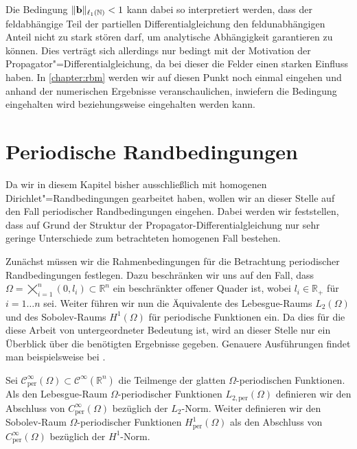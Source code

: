 \documentclass[../main.tex]{subfiles}
\begin{document}
Die Bedingung $\lVert\mathbf{b}\rVert_{\ell_{1}(\mathbb{N})} < 1$ kann dabei so interpretiert werden, dass der feldabhängige Teil der partiellen Differentialgleichung den feldunabhängigen Anteil nicht zu stark stören darf, um analytische Abhängigkeit garantieren zu können.
Dies verträgt sich allerdings nur bedingt mit der Motivation der Propagator"=Differentialgleichung, da bei dieser die Felder einen starken Einfluss haben.
In \cref{chapter:rbm} werden wir auf diesen Punkt noch einmal eingehen und anhand der numerischen Ergebnisse veranschaulichen, inwiefern die Bedingung eingehalten wird beziehungsweise eingehalten werden kann.

\section{Periodische Randbedingungen} %
\label{section:periodische_randbedingungen}

Da wir in diesem Kapitel bisher ausschließlich mit homogenen Dirichlet"=Randbedingungen gearbeitet haben, wollen wir an dieser Stelle auf den Fall periodischer Randbedingungen eingehen.
Dabei werden wir feststellen, dass auf Grund der Struktur der Propagator-Differentialgleichung nur sehr geringe Unterschiede zum betrachteten homogenen Fall bestehen.

Zunächst müssen wir die Rahmenbedingungen für die Betrachtung periodischer Randbedingungen festlegen.
Dazu beschränken wir uns auf den Fall, dass $\Omega = \bigtimes_{i = 1}^{n} (0, l_{i}) \subset \mathbb{R}^{n}$ ein beschränkter offener Quader ist, wobei $l_{i} \in \mathbb{R}_{+}$ für $i = 1 \dots n$ sei.
Weiter führen wir nun die Äquivalente des Lebesgue-Raums $L_{2}(\Omega)$ und des Sobolev-Raums $H^{1}(\Omega)$ für periodische Funktionen ein.
Da dies für die diese Arbeit von untergeordneter Bedeutung ist, wird an dieser Stelle nur ein Überblick über die benötigten Ergebnisse gegeben.
Genauere Ausführungen findet man beispielsweise bei \textcite{Han2009}.

\begin{Definition}
\label{definition:periodische_sobolev_raeume}
    Sei $\mathcal C_{\mathrm{per}}^{\infty}(\Omega) \subset \mathcal C^{\infty}(\mathbb{R}^{n})$ die Teilmenge der glatten $\Omega$-periodischen Funktionen.
    Als den Lebesgue-Raum $\Omega$-periodischer Funktionen $L_{2,\mathrm{per}}(\Omega)$  definieren wir den Abschluss von $C_{\mathrm{per}}^{\infty}(\Omega)$ bezüglich der $L_{2}$-Norm.
    Weiter definieren wir den Sobolev-Raum $\Omega$-periodischer Funktionen $H^{1}_{\mathrm{per}}(\Omega)$ als den Abschluss von $C_{\mathrm{per}}^{\infty}(\Omega)$ bezüglich der $H^{1}$-Norm.
\end{Definition}
\end{document}
